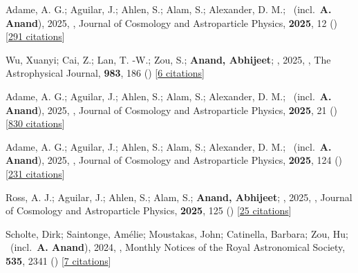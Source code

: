 \item[{\color{numcolor}\scriptsize16}] Adame, A. G.; Aguilar, J.; Ahlen, S.; Alam, S.; Alexander, D. M.; \etal\ (incl.\ \textbf{A. Anand}), 2025, , Journal of Cosmology and Astroparticle Physics, \textbf{2025}, 12 () [\href{https://ui.adsabs.harvard.edu/abs/2025JCAP...04..012A}{291 citations}]

\item[{\color{numcolor}\scriptsize15}] Wu, Xuanyi; Cai, Z.; Lan, T. -W.; Zou, S.; \textbf{Anand, Abhijeet}; \etal, 2025, , The Astrophysical Journal, \textbf{983}, 186 () [\href{https://ui.adsabs.harvard.edu/abs/2025ApJ...983..186W}{6 citations}]

\item[{\color{numcolor}\scriptsize14}] Adame, A. G.; Aguilar, J.; Ahlen, S.; Alam, S.; Alexander, D. M.; \etal\ (incl.\ \textbf{A. Anand}), 2025, , Journal of Cosmology and Astroparticle Physics, \textbf{2025}, 21 () [\href{https://ui.adsabs.harvard.edu/abs/2025JCAP...02..021A}{830 citations}]

\item[{\color{numcolor}\scriptsize13}] Adame, A. G.; Aguilar, J.; Ahlen, S.; Alam, S.; Alexander, D. M.; \etal\ (incl.\ \textbf{A. Anand}), 2025, , Journal of Cosmology and Astroparticle Physics, \textbf{2025}, 124 () [\href{https://ui.adsabs.harvard.edu/abs/2025JCAP...01..124A}{231 citations}]

\item[{\color{numcolor}\scriptsize12}] Ross, A. J.; Aguilar, J.; Ahlen, S.; Alam, S.; \textbf{Anand, Abhijeet}; \etal, 2025, , Journal of Cosmology and Astroparticle Physics, \textbf{2025}, 125 () [\href{https://ui.adsabs.harvard.edu/abs/2025JCAP...01..125R}{25 citations}]

\item[{\color{numcolor}\scriptsize11}] Scholte, Dirk; Saintonge, Am{\'e}lie; Moustakas, John; Catinella, Barbara; Zou, Hu; \etal\ (incl.\ \textbf{A. Anand}), 2024, , Monthly Notices of the Royal Astronomical Society, \textbf{535}, 2341 () [\href{https://ui.adsabs.harvard.edu/abs/2024MNRAS.535.2341S}{7 citations}]

